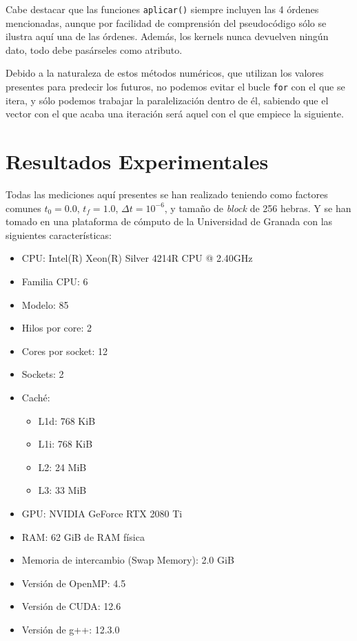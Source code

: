 Cabe destacar que las funciones \texttt{aplicar()} siempre incluyen las 4 órdenes mencionadas, aunque por facilidad de comprensión del pseudocódigo sólo se ilustra aquí una de las órdenes. Además, los kernels nunca devuelven ningún dato, todo debe pasárseles como atributo.

Debido a la naturaleza de estos métodos numéricos, que utilizan los valores presentes para predecir los futuros, no podemos evitar el bucle \texttt{for} con el que se itera, y sólo podemos trabajar la paralelización dentro de él, sabiendo que el vector con el que acaba una iteración será aquel con el que empiece la siguiente.

\section{Resultados Experimentales}

Todas las mediciones aquí presentes se han realizado teniendo como factores comunes $t_0=0.0$, $t_f=1.0$, $\Delta t= 10^{-6}$, y tamaño de \textit{block} de 256 hebras. Y se han tomado en una plataforma de cómputo de la Universidad de Granada con las siguientes características:
\begin{itemize}
	\item CPU: Intel(R) Xeon(R) Silver 4214R CPU @ 2.40GHz
	\item Familia CPU: 6
	\item Modelo: 85
	\item Hilos por core: 2
	\item Cores por socket: 12
	\item Sockets: 2
	\item Caché:
	\begin{itemize}
		\item L1d: 768 KiB
		\item L1i: 768 KiB
		\item L2: 24 MiB
		\item L3: 33 MiB
	\end{itemize}
	\item GPU: NVIDIA GeForce RTX 2080 Ti
	\item RAM: 62 GiB de RAM física
	\item Memoria de intercambio (Swap Memory): 2.0 GiB
	\item Versión de OpenMP: 4.5
	\item Versión de CUDA: 12.6
	\item Versión de g++: 12.3.0
\end{itemize}

